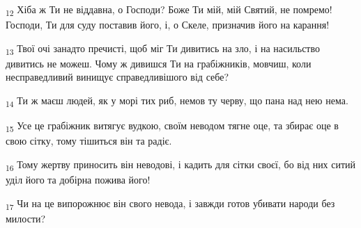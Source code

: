 \begin{tcolorbox}
\textsubscript{12} Хіба ж Ти не віддавна, о Господи? Боже Ти мій, мій Святий, не помремо! Господи, Ти для суду поставив його, і, о Скеле, призначив його на карання!
\end{tcolorbox}
\begin{tcolorbox}
\textsubscript{13} Твої очі занадто пречисті, щоб міг Ти дивитись на зло, і на насильство дивитись не можеш. Чому ж дивишся Ти на грабіжників, мовчиш, коли несправедливий винищує справедливішого від себе?
\end{tcolorbox}
\begin{tcolorbox}
\textsubscript{14} Ти ж маєш людей, як у морі тих риб, немов ту черву, що пана над нею нема.
\end{tcolorbox}
\begin{tcolorbox}
\textsubscript{15} Усе це грабіжник витягує вудкою, своїм неводом тягне оце, та збирає оце в свою сітку, тому тішиться він та радіє.
\end{tcolorbox}
\begin{tcolorbox}
\textsubscript{16} Тому жертву приносить він неводові, і кадить для сітки своєї, бо від них ситий уділ його та добірна пожива його!
\end{tcolorbox}
\begin{tcolorbox}
\textsubscript{17} Чи на це випорожнює він свого невода, і завжди готов убивати народи без милости?
\end{tcolorbox}
